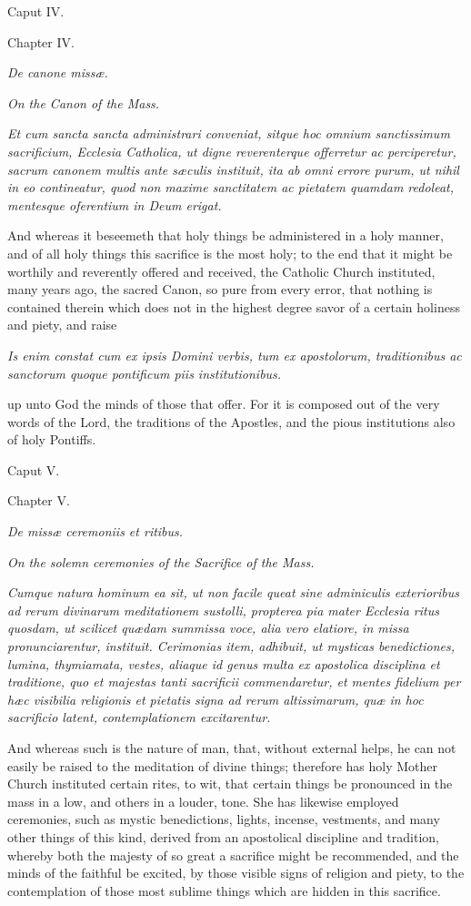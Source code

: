 Caput IV.

Chapter IV.

\emph{De canone missæ.}

\emph{On the Canon of the Mass.}

\emph{Et cum sancta sancta administrari conveniat, sitque hoc omnium sanctissimum sacrificium, Ecclesia Catholica, ut digne reverenterque offerretur ac perciperetur, sacrum canonem multis ante sæculis instituit, ita ab omni errore purum, ut nihil in eo contineatur, quod non maxime sanctitatem ac pietatem quamdam redoleat, mentesque oferentium in Deum erigat.}

And whereas it beseemeth that holy things be administered in a holy manner, and of all holy things this sacrifice is the most holy; to the end that it might be worthily and reverently offered and received, the Catholic Church instituted, many years ago, the sacred Canon, so pure from every error, that nothing is contained therein which does not in the highest degree savor of a certain holiness and piety, and raise

\emph{Is enim constat cum ex ipsis Domini verbis, tum ex apostolorum, traditionibus ac sanctorum quoque pontificum piis institutionibus.}

up unto God the minds of those that offer. For it is composed out of the very words of the Lord, the traditions of the Apostles, and the pious institutions also of holy Pontiffs.

Caput V.

Chapter V.

\emph{De missæ ceremoniis et ritibus.}

\emph{On the solemn ceremonies of the Sacrifice of the Mass.}

\emph{Cumque natura hominum ea sit, ut non facile queat sine adminiculis exterioribus ad rerum divinarum meditationem sustolli, propterea pia mater Ecclesia ritus quosdam, ut scilicet quædam summissa voce, alia vero elatiore, in missa pronunciarentur, instituit. Cerimonias item, adhibuit, ut mysticas benedictiones, lumina, thymiamata, vestes, aliaque id genus multa ex apostolica disciplina et traditione, quo et majestas tanti sacrificii commendaretur, et mentes fidelium per hæc visibilia religionis et pietatis signa ad rerum altissimarum, quæ in hoc sacrificio latent, contemplationem excitarentur.}

And whereas such is the nature of man, that, without external helps, he can not easily be raised to the meditation of divine things; therefore has holy Mother Church instituted certain rites, to wit, that certain things be pronounced in the mass in a low, and others in a louder, tone. She has likewise employed ceremonies, such as mystic benedictions, lights, incense, vestments, and many other things of this kind, derived from an apostolical discipline and tradition, whereby both the majesty of so great a sacrifice might be recommended, and the minds of the faithful be excited, by those visible signs of religion and piety, to the contemplation of those most sublime things which are hidden in this sacrifice.

